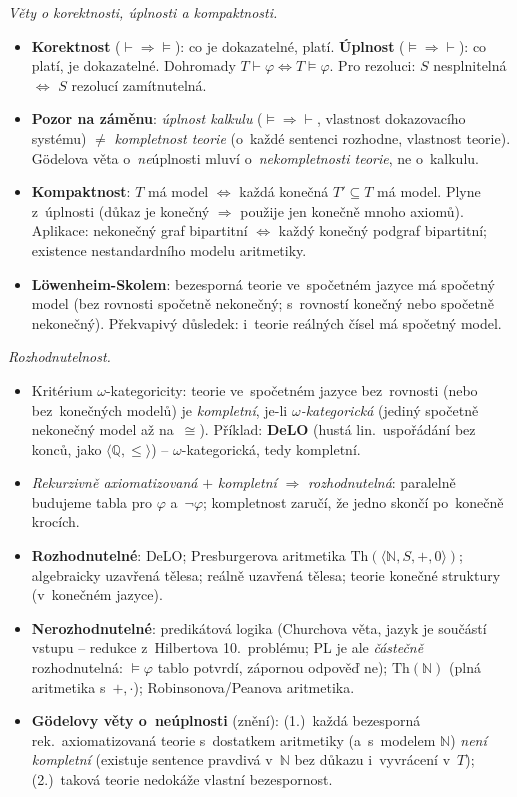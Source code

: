 \documentclass[11pt,a4paper]{article}
\begin{document}
\begin{poznamka}
\smallskip
\emph{Věty o korektnosti, úplnosti a kompaktnosti.}
\begin{itemize}
  \item \textbf{Korektnost} ($\vdash\Rightarrow\models$): co je dokazatelné, platí. \textbf{Úplnost} ($\models\Rightarrow\vdash$): co platí, je dokazatelné. Dohromady $T\vdash\varphi\iff T\models\varphi$. Pro rezoluci: $S$ nesplnitelná $\iff$ $S$ rezolucí zamítnutelná.
  \item \textbf{Pozor na záměnu}: \emph{úplnost kalkulu} ($\models\Rightarrow\vdash$, vlastnost dokazovacího systému) $\neq$ \emph{kompletnost teorie} (o~každé sentenci rozhodne, vlastnost teorie). Gödelova věta o~\emph{ne}úplnosti mluví o~\emph{nekompletnosti teorie}, ne o~kalkulu.
  \item \textbf{Kompaktnost}: $T$ má model $\iff$ každá konečná $T'\subseteq T$ má model. Plyne z~úplnosti (důkaz je konečný $\Rightarrow$ použije jen konečně mnoho axiomů). Aplikace: nekonečný graf bipartitní $\iff$ každý konečný podgraf bipartitní; existence nestandardního modelu aritmetiky.
  \item \textbf{Löwenheim-Skolem}: bezesporná teorie ve~spočetném jazyce má spočetný model (bez rovnosti spočetně nekonečný; s~rovností konečný nebo spočetně nekonečný). Překvapivý důsledek: i~teorie reálných čísel má spočetný model.
\end{itemize}

\smallskip
\emph{Rozhodnutelnost.}
\begin{itemize}
  \item Kritérium $\omega$-kategoricity: teorie ve~spočetném jazyce bez~rovnosti (nebo bez~konečných modelů) je \emph{kompletní}, je-li \emph{$\omega$-kategorická} (jediný spočetně nekonečný model až na~$\cong$). Příklad: \textbf{DeLO} (hustá lin.\ uspořádání bez konců, jako $\langle\mathbb{Q},\le\rangle$) -- $\omega$-kategorická, tedy kompletní.
  \item \emph{Rekurzivně axiomatizovaná} $+$ \emph{kompletní} $\Rightarrow$ \emph{rozhodnutelná}: paralelně budujeme tabla pro $\varphi$ a~$\neg\varphi$; kompletnost zaručí, že jedno skončí po~konečně krocích.
  \item \textbf{Rozhodnutelné}: DeLO; Presburgerova aritmetika $\mathrm{Th}(\langle\mathbb{N},S,+,0\rangle)$; algebraicky uzavřená tělesa; reálně uzavřená tělesa; teorie konečné struktury (v~konečném jazyce).
  \item \textbf{Nerozhodnutelné}: predikátová logika (Churchova věta, jazyk je součástí vstupu -- redukce z~Hilbertova 10.~problému; PL je ale \emph{částečně} rozhodnutelná: $\models\varphi$ tablo potvrdí, zápornou odpověď ne); $\mathrm{Th}(\mathbb{N})$ (plná aritmetika s~$+,\cdot$); Robinsonova/Peanova aritmetika.
  \item \textbf{Gödelovy věty o~neúplnosti} (znění): (1.)~každá bezesporná rek.\ axiomatizovaná teorie s~dostatkem aritmetiky (a~s~modelem $\mathbb{N}$) \emph{není kompletní} (existuje sentence pravdivá v~$\mathbb{N}$ bez důkazu i~vyvrácení v~$T$); (2.)~taková teorie nedokáže vlastní bezespornost.
\end{itemize}
\end{poznamka}
\end{document}

